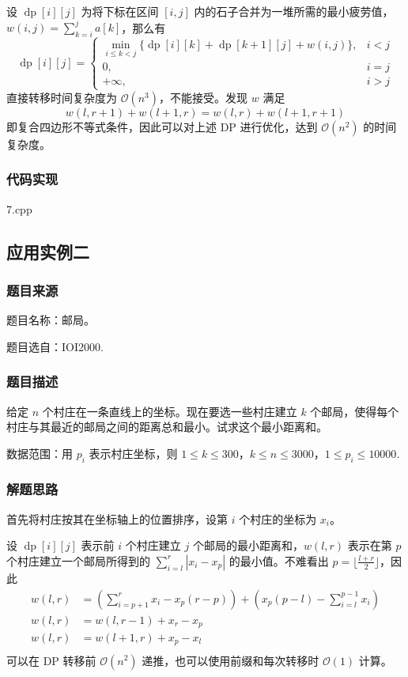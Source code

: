 设 \(\operatorname{dp}[i][j]\) 为将下标在区间 \([i,j]\)
内的石子合并为一堆所需的最小疲劳值，\(w(i,j)=\sum_{k=i}^ja[k]\)，那么有
\[
\operatorname{dp}[i][j]=
\left\{
\begin{array}{ll}
\min\limits_{i\le k\lt j}\{\operatorname{dp}[i][k]+\operatorname{dp}[k+1][j]+w(i,j)\},&i\lt j\\
0,&i=j\\
+\infty, &i>j
\end{array}
\right.
\] 直接转移时间复杂度为 \(\mathcal{O}(n^3)\)，不能接受。发现 \(w\) 满足
\[
w(l,r+1)+w(l+1,r)=w(l,r)+w(l+1,r+1)
\] 即复合四边形不等式条件，因此可以对上述 DP 进行优化，达到
\(\mathcal{O}(n^2)\) 的时间复杂度。

\subsubsection{代码实现}

7.cpp

\subsection{应用实例二}

\subsubsection{题目来源}

题目名称：邮局。

题目选自：IOI2000.

\subsubsection{题目描述}

给定 \(n\) 个村庄在一条直线上的坐标。现在要选一些村庄建立 \(k\)
个邮局，使得每个村庄与其最近的邮局之间的距离总和最小。试求这个最小距离和。

数据范围：用 \(p_i\) 表示村庄坐标，则
\(1\le k\le 300\)，\(k\le n\le 3000\)，\(1 \le p_i\le 10000\).

\subsubsection{解题思路}

首先将村庄按其在坐标轴上的位置排序，设第 \(i\) 个村庄的坐标为 \(x_i\)。

设 \(\operatorname{dp}[i][j]\) 表示前 \(i\) 个村庄建立 \(j\)
个邮局的最小距离和，\(w(l,r)\) 表示在第 \(p\) 个村庄建立一个邮局所得到的
\(\sum_{i=l}^r|x_i-x_p|\) 的最小值。不难看出
\(p=\lfloor \frac{l+r}{2}\rfloor\)，因此 \[
\begin{aligned}
w(l,r)&=(\sum_{i=p+1}^rx_i-x_p(r-p))+(x_p(p-l)-\sum_{i=l}^{p-1}x_i)\\
w(l,r)&=w(l,r-1)+x_r-x_p\\
w(l,r)&=w(l+1,r)+x_p-x_l\\
\end{aligned}
\] 可以在 DP 转移前 \(\mathcal{O}(n^2)\)
递推，也可以使用前缀和每次转移时 \(\mathcal{O}(1)\) 计算。

